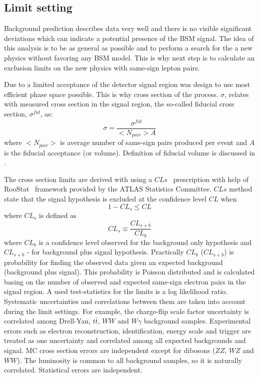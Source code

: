 \subsection{Limit setting}

Background prediction describes data very well and there is no visible significant deviations which can indicate a potential presence of the BSM signal.
The idea of this analysis is to be as general as possible and to perform a search for the a new physics without favoring any BSM model.
This is why next step is to calculate an exclusion limits on the new physics with same-sign lepton pairs.

Due to a limited acceptance of the detector signal region was design to use most efficient phase space possible.
This is why cross section of the process. $\sigma$, relates with measured cross section in the signal region, the so-called fiducial cross section, $\sigma^{fid}$, as:
\begin{equation}
 \sigma = \dfrac{\sigma^{fid}}{<N_{pair}>A}
 \label{eq:cross_section}
\end{equation}
where $<N_{pair}>$ is average number of same-sign pairs produced per event and $A$ is the fiducial acceptance (or volume).
Definition of fiducial volume is discussed in .

The cross section limits are derived with using a $CLs$~\cite{CLs_tecnique,CLs_2} prescription with help of RooStat~\cite{RooStat_project} framework 
provided by the ATLAS Statistics Committee. $CLs$ method state that the signal hypothesis is excluded at the confidence level $CL$ when
\begin{equation}
 1 - CL_s \leq CL
\end{equation}
where $CL_s$ is defined as
\begin{equation}
 CL_s \equiv \dfrac{CL_{s+b}}{CL_b}
\end{equation}
where $CL_b$ is a confidence level observed for the background only hypothesis and $CL_{s+b}$ - for background plus signal hypothesis.
Practically $CL_b$ ($CL_{s+b}$) is probability for finding the observed data given an expected background (background plus signal).
This probability is Poisson distributed and is calculated basing on the number of observed and expected same-sign electron pairs in the signal region.
A used test-statistics for the limits is a log likelihood ratio.
 Systematic uncertainties and correlations between them are taken into account during the limit settings.
For example, the charge-flip scale factor uncertainty is correlated among Drell-Yan, $t\bar{t}$, $WW$ and $W\gamma$ background samples.
Experimental errors such as electron reconstruction, identification, energy scale and trigger 
are treated as one uncertainty and correlated among all expected backgrounds and signal.
MC cross section errors are independent except for dibosons ($ZZ$, $WZ$ and $WW$).
The luminosity is common to all background samples, so it is naturally correlated.
Statistical errors are independent.


